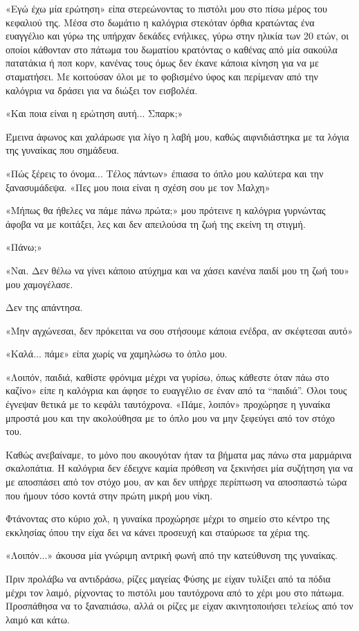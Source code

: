 \documentclass[12pt,twoside, openany]{book}
\begin{document}
«Εγώ έχω μία ερώτηση» είπα στερεώνοντας το πιστόλι μου στο πίσω μέρος του κεφαλιού της. Μέσα στο δωμάτιο η καλόγρια στεκόταν όρθια κρατώντας ένα ευαγγέλιο και γύρω της υπήρχαν δεκάδες ενήλικες, γύρω στην ηλικία των 20 ετών, οι οποίοι κάθονταν στο πάτωμα του δωματίου κρατόντας ο καθένας από μία σακούλα πατατάκια ή ποπ κορν, κανένας τους όμως δεν έκανε κάποια κίνηση για να με σταματήσει. Με κοιτούσαν όλοι με το φοβισμένο ύφος και περίμεναν από την καλόγρια να δράσει για να διώξει τον εισβολέα.

«Και ποια είναι η ερώτηση αυτή... Σπαρκ;»

Έμεινα άφωνος και χαλάρωσε για λίγο η λαβή μου, καθώς αιφνιδιάστηκα με τα λόγια της γυναίκας που σημάδευα.

«Πώς ξέρεις το όνομα... Τέλος πάντων» έπιασα το όπλο μου καλύτερα και την ξανασυμάδεψα. «Πες μου ποια είναι η σχέση σου με τον Μαλχη»

«Μήπως θα ήθελες να πάμε πάνω πρώτα;» μου πρότεινε η καλόγρια γυρνώντας άφοβα να με κοιτάξει, λες και δεν απειλούσα τη ζωή της εκείνη τη στιγμή.

«Πάνω;»

«Ναι. Δεν θέλω να γίνει κάποιο ατύχημα και να χάσει κανένα παιδί μου τη ζωή του» μου χαμογέλασε.

Δεν της απάντησα.

«Μην αγχώνεσαι, δεν πρόκειται να σου στήσουμε κάποια ενέδρα, αν σκέφτεσαι αυτό»

«Καλά... πάμε» είπα χωρίς να χαμηλώσω το όπλο μου.

«Λοιπόν, παιδιά, καθίστε φρόνιμα μέχρι να γυρίσω, όπως κάθεστε όταν πάω στο καζίνο» είπε η καλόγρια και άφησε το ευαγγέλιο σε έναν από τα “παιδιά”. Όλοι τους έγνεψαν θετικά με το κεφάλι ταυτόχρονα. «Πάμε, λοιπόν» προχώρησε η γυναίκα μπροστά μου και την ακολούθησα με το όπλο μου να μην ξεφεύγει από τον στόχο του.

Καθώς ανεβαίναμε, το μόνο που ακουγόταν ήταν τα βήματα μας πάνω στα μαρμάρινα σκαλοπάτια. Η καλόγρια δεν έδειχνε καμία πρόθεση να ξεκινήσει μία συζήτηση για να με αποσπάσει από τον στόχο μου, αν και δεν υπήρχε περίπτωση να αποσπαστώ τώρα που ήμουν τόσο κοντά στην πρώτη μικρή μου νίκη.

Φτάνοντας στο κύριο χολ, η γυναίκα προχώρησε μέχρι το σημείο στο κέντρο της εκκλησίας όπου την είχα δει να κάνει προσευχή και σταύρωσε τα χέρια της.

«Λοιπόν...» άκουσα μία γνώριμη αντρική φωνή από την κατεύθυνση της γυναίκας.

Πριν προλάβω να αντιδράσω, ρίζες μαγείας Φύσης με είχαν τυλίξει από τα πόδια μέχρι τον λαιμό, ρίχνοντας το πιστόλι μου ταυτόχρονα από το χέρι μου στο πάτωμα. Προσπάθησα να το ξαναπιάσω, αλλά οι ρίζες με είχαν ακινητοποιήσει τελείως από τον λαιμό και κάτω.
\end{document}
